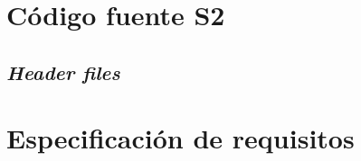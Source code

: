 \chapter{Código fuente S2}
\label{anex:source_code}
\section{\textit{Header files}}












\chapter{Especificación de requisitos}
\label{anex:requirements}
